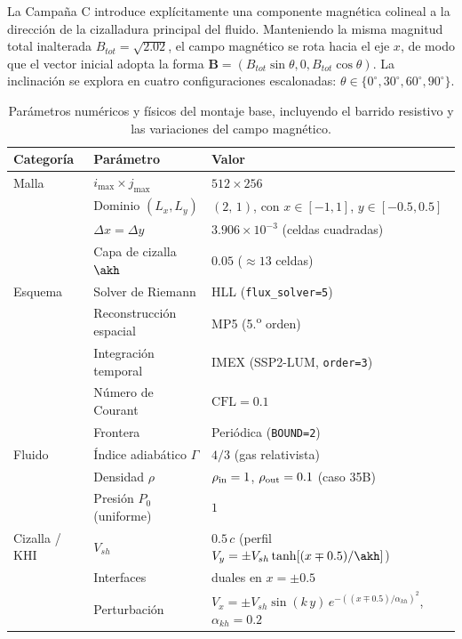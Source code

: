 \primerparrafo La Campaña C introduce explícitamente una componente magnética colineal a la dirección de la cizalladura principal del fluido. Manteniendo la misma magnitud total inalterada $B_{tot} = \sqrt{2.02}$, el campo magnético se rota hacia el eje $x$, de modo que el vector inicial adopta la forma $\mathbf{B} = (B_{tot}\sin\theta, 0, B_{tot}\cos\theta)$. La inclinación se explora en cuatro configuraciones escalonadas: $\theta \in \{0^\circ, 30^\circ, 60^\circ, 90^\circ\}$.

\begin{table}[H]\centering
\caption{Parámetros numéricos y físicos del montaje base, incluyendo el barrido resistivo y las variaciones del campo magnético.}
\label{tab:setup}
\begin{tabular}{lll}
\toprule
Categoría & Parámetro & Valor\\
\midrule
Malla        & $i_{\max}\times j_{\max}$ & $512\times256$\\
             & Dominio $(L_x,L_y)$       & $(2,\,1)$, con $x\in[-1,1]$, $y\in[-0.5,0.5]$\\
             & $\Delta x=\Delta y$       & $3.906\times10^{-3}$ (celdas cuadradas)\\
             & Capa de cizalla $\akh$    & $0.05$ ($\approx13$ celdas)\\
\midrule
Esquema      & Solver de Riemann         & HLL (\texttt{flux\_solver=5})\\
             & Reconstrucción espacial   & MP5 (5.\textsuperscript{o} orden)\\
             & Integración temporal      & IMEX (SSP2-LUM, \texttt{order=3})\\
             & Número de Courant         & $\mathrm{CFL}=0.1$\\
             & Frontera                  & Periódica (\texttt{BOUND=2})\\
\midrule
Fluido       & Índice adiabático $\Gamma$ & $4/3$ (gas relativista)\\
             & Densidad $\rho$            & $\rho_{\rm in}=1$, $\rho_{\rm out}=0.1$ (caso 35B)\\
             & Presión $P_0$ (uniforme)  & $1$\\
\midrule
Cizalla / KHI & $V_{sh}$                 & $0.5\,c$ (perfil $V_y=\pm V_{sh}\tanh[(x\mp0.5)/\akh]$)\\
              & Interfaces               & duales en $x=\pm0.5$\\
              & Perturbación             & $V_x=\pm V_{sh}\sin(k\, y)\,e^{-((x\mp0.5)/\alpha_{kh})^2}$, $\alpha_{kh}=0.2$\\

\end{tabular}
\end{table}
